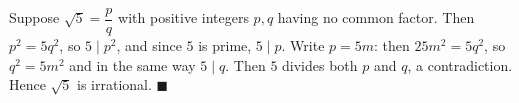 Suppose $\sqrt5=\dfrac pq$ with positive integers $p,q$ having no common factor. Then $p^2=5q^2$, so $5\mid p^2$, and since $5$ is prime, $5\mid p$. Write $p=5m$: then $25m^2=5q^2$, so $q^2=5m^2$ and in the same way $5\mid q$. Then $5$ divides both $p$ and $q$, a contradiction. Hence $\sqrt5$ is irrational. $\blacksquare$
